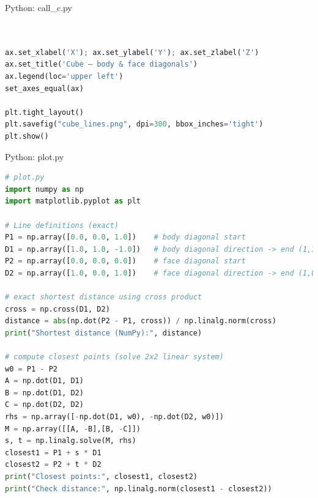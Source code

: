 \documentclass{beamer}
\numberwithin{equation}{section}
\theoremstyle{remark}
\begin{document}
\begin{frame}[fragile]{Python: call\_c.py}
\begin{lstlisting}[language=Python]


ax.set_xlabel('X'); ax.set_ylabel('Y'); ax.set_zlabel('Z')
ax.set_title('Cube — body & face diagonals')
ax.legend(loc='upper left')
set_axes_equal(ax)

plt.tight_layout()
plt.savefig("cube_lines.png", dpi=300, bbox_inches='tight')
plt.show()

\end{lstlisting}
\end{frame}

\begin{frame}[fragile]{Python: plot.py}
\begin{lstlisting}[language=Python]
# plot.py
import numpy as np
import matplotlib.pyplot as plt

# Line definitions (exact)
P1 = np.array([0.0, 0.0, 1.0])    # body diagonal start
D1 = np.array([1.0, 1.0, -1.0])   # body diagonal direction -> end (1,1,0)
P2 = np.array([0.0, 0.0, 0.0])    # face diagonal start
D2 = np.array([1.0, 0.0, 1.0])    # face diagonal direction -> end (1,0,1)

# exact shortest distance using cross product
cross = np.cross(D1, D2)
distance = abs(np.dot(P2 - P1, cross)) / np.linalg.norm(cross)
print("Shortest distance (NumPy):", distance)

# compute closest points (solve 2x2 linear system)
w0 = P1 - P2
A = np.dot(D1, D1)
B = np.dot(D1, D2)
C = np.dot(D2, D2)
rhs = np.array([-np.dot(D1, w0), -np.dot(D2, w0)])
M = np.array([[A, -B],[B, -C]])
s, t = np.linalg.solve(M, rhs)
closest1 = P1 + s * D1
closest2 = P2 + t * D2
print("Closest points:", closest1, closest2)
print("Check distance:", np.linalg.norm(closest1 - closest2))

\end{lstlisting}
\end{frame}
\end{document}
